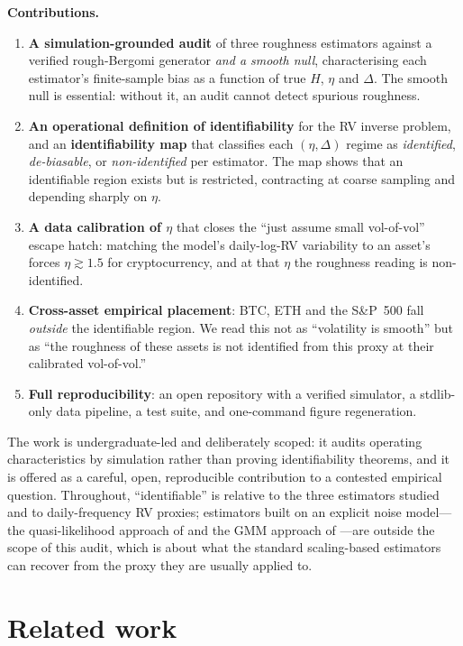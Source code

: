 \documentclass[11pt]{article}
\begin{document}
\medskip
\noindent\textbf{Contributions.}
\begin{enumerate}
\item \textbf{A simulation-grounded audit} of three roughness estimators against a
verified rough-Bergomi generator \emph{and a smooth null}, characterising each
estimator's finite-sample bias as a function of true $H$, $\eta$ and $\Delta$. The
smooth null is essential: without it, an audit cannot detect spurious roughness.
\item \textbf{An operational definition of identifiability} for the RV inverse
problem, and an \textbf{identifiability map} that classifies each $(\eta, \Delta)$
regime as \emph{identified}, \emph{de-biasable}, or \emph{non-identified} per
estimator. The map shows that an identifiable region exists but is restricted,
contracting at coarse sampling and depending sharply on $\eta$.
\item \textbf{A data calibration of $\eta$} that closes the ``just assume small
vol-of-vol'' escape hatch: matching the model's daily-log-RV variability to an
asset's forces $\eta \gtrsim 1.5$ for cryptocurrency, and at that $\eta$ the
roughness reading is non-identified.
\item \textbf{Cross-asset empirical placement}: BTC, ETH and the S\&P~500 fall
\emph{outside} the identifiable region. We read this not as ``volatility is smooth''
but as ``the roughness of these assets is not identified from this proxy at their
calibrated vol-of-vol.''
\item \textbf{Full reproducibility}: an open repository with a verified simulator, a
stdlib-only data pipeline, a test suite, and one-command figure regeneration.
\end{enumerate}

The work is undergraduate-led and deliberately scoped: it audits operating
characteristics by simulation rather than proving identifiability theorems, and it
is offered as a careful, open, reproducible contribution to a contested empirical
question. Throughout, ``identifiable'' is relative to the three estimators studied
and to daily-frequency RV proxies; estimators built on an explicit noise
model---the quasi-likelihood approach of \cite{ftw2022} and the GMM approach of
\cite{bolko2023}---are outside the scope of this audit, which is about what the
standard scaling-based estimators can recover from the proxy they are usually
applied to.

\section{Related work}
\end{document}
